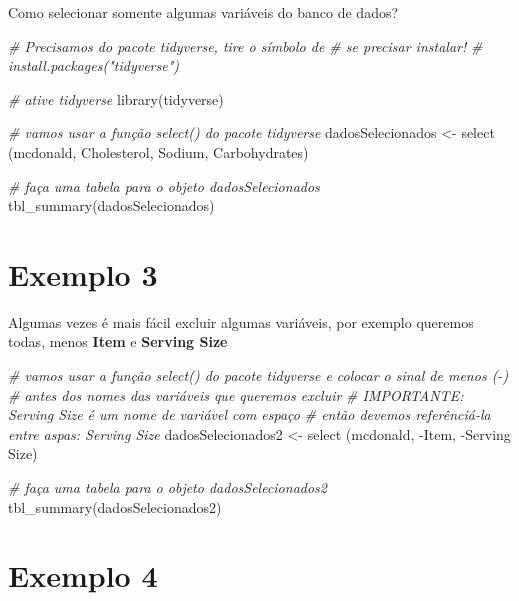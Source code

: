 \documentclass[
]{book}
\newenvironment{Shaded}{\begin{snugshade}}{\end{snugshade}}
\newcommand{\AttributeTok}[1]{\textcolor[rgb]{0.77,0.63,0.00}{#1}}
\newcommand{\CommentTok}[1]{\textcolor[rgb]{0.56,0.35,0.01}{\textit{#1}}}
\newcommand{\FunctionTok}[1]{\textcolor[rgb]{0.00,0.00,0.00}{#1}}
\newcommand{\NormalTok}[1]{#1}
\newcommand{\OtherTok}[1]{\textcolor[rgb]{0.56,0.35,0.01}{#1}}
\newcommand{\SpecialCharTok}[1]{\textcolor[rgb]{0.00,0.00,0.00}{#1}}
\newcommand{\StringTok}[1]{\textcolor[rgb]{0.31,0.60,0.02}{#1}}
\begin{document}
Como selecionar somente algumas variáveis do banco de dados?

\begin{Shaded}
\begin{Highlighting}[]
\CommentTok{\# Precisamos do pacote tidyverse, tire o símbolo de \# se precisar instalar!}
\CommentTok{\# install.packages("tidyverse")}

\CommentTok{\# ative tidyverse}
\FunctionTok{library}\NormalTok{(tidyverse)}

\CommentTok{\# vamos usar a função select() do pacote tidyverse}
\NormalTok{dadosSelecionados }\OtherTok{\textless{}{-}} \FunctionTok{select}\NormalTok{ (mcdonald, Cholesterol, Sodium, Carbohydrates)}

\CommentTok{\# faça uma tabela para o objeto dadosSelecionados}
\FunctionTok{tbl\_summary}\NormalTok{(dadosSelecionados)}
\end{Highlighting}
\end{Shaded}

\hypertarget{exemplo-3-2}{%
\section{Exemplo 3}\label{exemplo-3-2}}

Algumas vezes é mais fácil excluir algumas variáveis, por exemplo queremos todas, menos \textbf{Item} e \textbf{Serving Size}

\begin{Shaded}
\begin{Highlighting}[]
\CommentTok{\# vamos usar a função select() do pacote tidyverse e colocar o sinal de menos ({-})}
\CommentTok{\# antes dos nomes das variáveis que queremos excluir}
\CommentTok{\# IMPORTANTE: Serving Size é um nome de variável com espaço }
\CommentTok{\# então devemos referênciá{-}la entre aspas: \textasciigrave{}Serving Size\textasciigrave{}}
\NormalTok{dadosSelecionados2 }\OtherTok{\textless{}{-}} \FunctionTok{select}\NormalTok{ (mcdonald, }\SpecialCharTok{{-}}\NormalTok{Item, }\SpecialCharTok{{-}}\StringTok{\textasciigrave{}}\AttributeTok{Serving Size}\StringTok{\textasciigrave{}}\NormalTok{)}

\CommentTok{\# faça uma tabela para o objeto dadosSelecionados2}
\FunctionTok{tbl\_summary}\NormalTok{(dadosSelecionados2)}
\end{Highlighting}
\end{Shaded}

\hypertarget{exemplo-4}{%
\section{Exemplo 4}\label{exemplo-4}}
\end{document}
